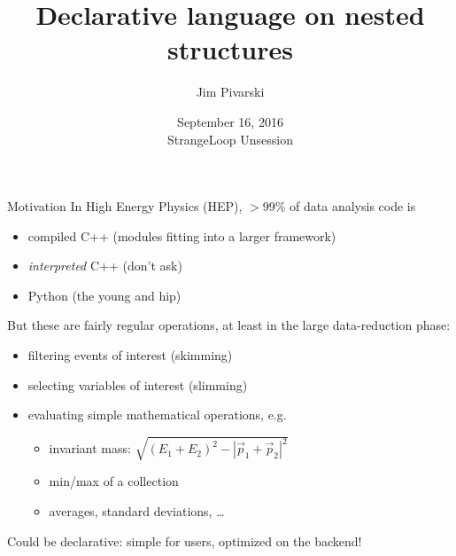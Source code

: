 \documentclass{beamer}
\title[16-09-2016-unsession]{Declarative language on nested structures}
\author{Jim Pivarski}
\institute{Princeton University -- Project DIANA}
\date{September 16, 2016 \\ StrangeLoop Unsession}
\begin{document}

\begin{frame}
  \titlepage
\end{frame}



\begin{frame}{Motivation}
\vspace{0.5 cm}
In High Energy Physics (HEP), $>$99\% of data analysis code is
\begin{itemize}
\item compiled C++ (modules fitting into a larger framework)
\item {\it interpreted} C++ (don't ask)
\item Python (the young and hip)
\end{itemize}

\vspace{0.5 cm}
But these are fairly regular operations, at least in the large data-reduction phase:
\begin{itemize}
\item filtering events of interest (skimming)
\item selecting variables of interest (slimming)
\item evaluating simple mathematical operations, e.g.
\begin{itemize}
\item invariant mass: $\sqrt{(E_1 + E_2)^2 - |\vec{p}_1 + \vec{p}_2|^2}$
\item min/max of a collection
\item averages, standard deviations, \ldots
\end{itemize}
\end{itemize}

\vspace{0.5 cm}
Could be declarative: simple for users, optimized on the backend!
\end{frame}
\end{document}
